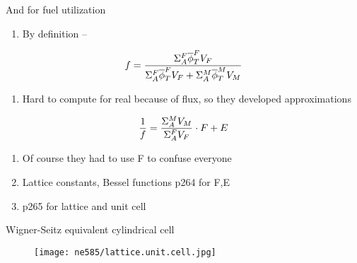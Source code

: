 \documentclass[aspectratio=1610,pdftex,dvipsnames,compress,xcolor={dvipsnames}]{beamer}
\begin{document}
\begin{frame}{And for fuel utilization}
    \begin{enumerate}[series=outerlist,topsep=0pt,itemsep=21pt,leftmargin=*,label=(\arabic*)]
        \item[]By definition --
    \end{enumerate}

    \vspace*{\fill}

    \begin{equation}
        \LARGE
        f = \frac{\Sigma_A^F \overline{\phi}_T^F V_F}{\Sigma_A^F \overline{\phi}_T^F V_F + \Sigma_A^M \overline{\phi}_T^M V_M}
    \end{equation}

    \vspace*{\fill}

    \begin{enumerate}[series=outerlist,topsep=0pt,itemsep=21pt,leftmargin=*,label=(\arabic*)]
        \item[]Hard to compute for real because of flux, so they developed approximations
    \end{enumerate}

    \vspace*{\fill}

    \begin{equation}
        \LARGE
        \frac{1}{f} = \frac{\Sigma_A^M V_M}{\Sigma_A^F V_F} \cdot F + E
    \end{equation}

    \vspace*{\fill}

    \begin{enumerate}[series=outerlist,topsep=0pt,itemsep=21pt,leftmargin=*,label=(\arabic*)]
        \item[]Of course they had to use F to confuse everyone
        \item[]Lattice constants, Bessel functions p264 for F,E
        \item[]p265 for lattice and unit cell
    \end{enumerate}
\end{frame}


\begin{frame}{Wigner-Seitz equivalent cylindrical cell}
    \begin{figure}
        \centering
        \texttt{[image: ne585/lattice.unit.cell.jpg]}
    \end{figure}
\end{frame}
\end{document}
